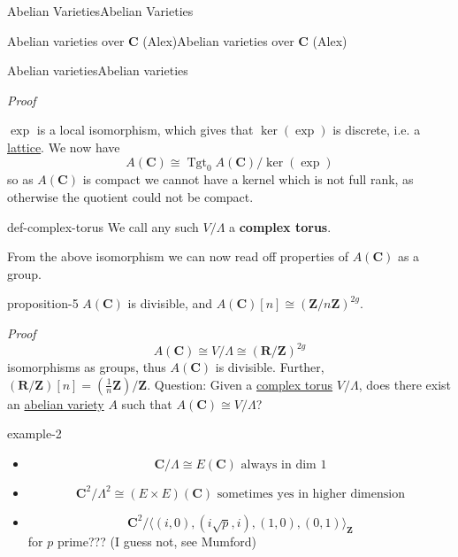 \documentclass[10pt,]{book}
\makeatletter
\newcommand{\terminology}[1]{\textbf{#1}}
\renewcommand*{\proofname}{Proof}
\renewenvironment{proof}[1][\proofname]{\par
  \pushQED{\qed}%
  \normalfont \topsep6\p@\@plus6\p@\relax
  \trivlist
  \item\relax
    {\itshape
    #1\@addpunct{.}}\hspace\labelsep\ignorespaces
}{%
  \popQED\endtrivlist\@endpefalse
}
\numberwithin{equation}{section}
\newcommand{\lb}{[}
\newcommand{\rb}{]}
\newcommand{\ZZ}{\mathbf{Z}}
\newcommand{\RR}{\mathbf{R}}
\newcommand{\CC}{\mathbf{C}}
\DeclareMathOperator{\Tgt}{Tgt}
\makeatother
\begin{document}
\begin{chapterptx}{Abelian Varieties}{}{Abelian Varieties}{}{}
\begin{sectionptx}{Abelian varieties over \(\CC\) (Alex)}{}{Abelian varieties over \(\CC\) (Alex)}{}{}
\begin{subsectionptx}{Abelian varieties}{}{Abelian varieties}{}{}
\begin{proof}
\par
\hypertarget{p-45}{}%
\(\exp\) is a local isomorphism, which gives that \(\ker(\exp)\) is discrete, i.e. a \hyperref[def-buntes-lattice]{lattice}. We now have%
\begin{equation*}
A(\CC) \cong \Tgt_0A(\CC)/ \ker(\exp)
\end{equation*}
so as \(A(\CC)\) is compact we cannot have a kernel which is not full rank, as otherwise the quotient could not be compact.%
\end{proof}
\begin{definition}{}{def-complex-torus}%
\hypertarget{p-46}{}%
We call any such \(V/\Lambda\) a \terminology{complex torus}.%
\end{definition}
\hypertarget{p-47}{}%
From the above isomorphism we can now read off properties of \(A(\CC)\) as a group.%
\begin{proposition}{}{}{proposition-5}%
\hypertarget{p-48}{}%
\(A(\CC)\) is divisible, and \(A(\CC)\lb n\rb \cong (\ZZ/n\ZZ)^{2g}\).%
\end{proposition}
\begin{proof}\hypertarget{proof-9}{}
\hypertarget{p-49}{}%
%
\begin{equation*}
A(\CC)  \cong V/\Lambda \cong (\RR/\ZZ)^{2g}
\end{equation*}
isomorphisms as groups, thus \(A(\CC)\) is divisible. Further, \((\RR/\ZZ)\lb n \rb = (\frac 1n \ZZ)/\ZZ\).%
\end{proof}
\hypertarget{p-50}{}%
Question: Given a \hyperref[def-complex-torus]{complex torus} \(V/\Lambda\), does there exist an \hyperref[def-buntes-abvar]{abelian variety} \(A\) such that \(A(\CC) \cong V/\Lambda\)?%
\begin{example}{}{example-2}%
\hypertarget{p-51}{}%
\leavevmode%
\begin{itemize}[label=\textbullet]
\item{}%
\begin{equation*}
\CC/\Lambda \cong E(\CC) \text{ always in dim 1}
\end{equation*}
%
\item{}%
\begin{equation*}
\CC^2/\Lambda^2 \cong (E\times E)(\CC) \text{ sometimes yes in higher dimension}
\end{equation*}
%
\item{}%
\begin{equation*}
\CC^2/\langle (i, 0), (i\sqrt p, i), (1, 0), (0, 1)\rangle_\ZZ
\end{equation*}
for \(p\) prime??? (I guess not, see Mumford)%

\end{itemize}
\end{example}
\end{subsectionptx}
\end{sectionptx}
\end{chapterptx}
\end{document}

